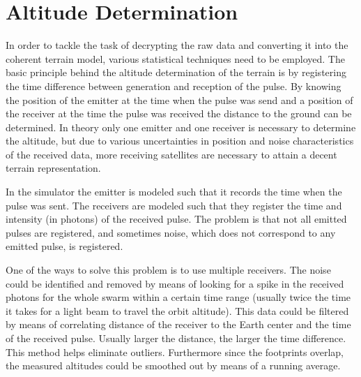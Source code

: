 \section{Altitude Determination}
In order to tackle the task of decrypting the raw data and converting it into the coherent terrain model, various statistical techniques need to be employed. The basic principle behind the altitude determination of the terrain is by registering the time difference between generation and reception of the pulse. By knowing the position of the emitter at the time when the pulse was send and a position of the receiver at the time the pulse was received the distance to the ground can be determined. In theory only one emitter and one receiver is necessary to determine the altitude, but due to various uncertainties in position and noise characteristics of the received data, more receiving satellites are necessary to attain a decent terrain representation. 

In the simulator the emitter is modeled such that it records the time when the pulse was sent. The receivers are modeled such that they register the time and intensity (in photons) of the received pulse. The problem is that not all emitted pulses are registered, and sometimes noise, which does not correspond to any emitted pulse, is registered. 

One of the ways to solve this problem is to use multiple receivers. The noise could be identified and removed by means of looking for a spike in the received photons for the whole swarm within a certain time range (usually twice the time it takes for a light beam to travel the orbit altitude). This data could be filtered by means of correlating distance of the receiver to the Earth center and the time of the received pulse. Usually larger the distance, the larger the time difference. This method helps eliminate outliers.
Furthermore since the footprints overlap, the measured altitudes could be smoothed out by means of a running average. 
\label{altDet}